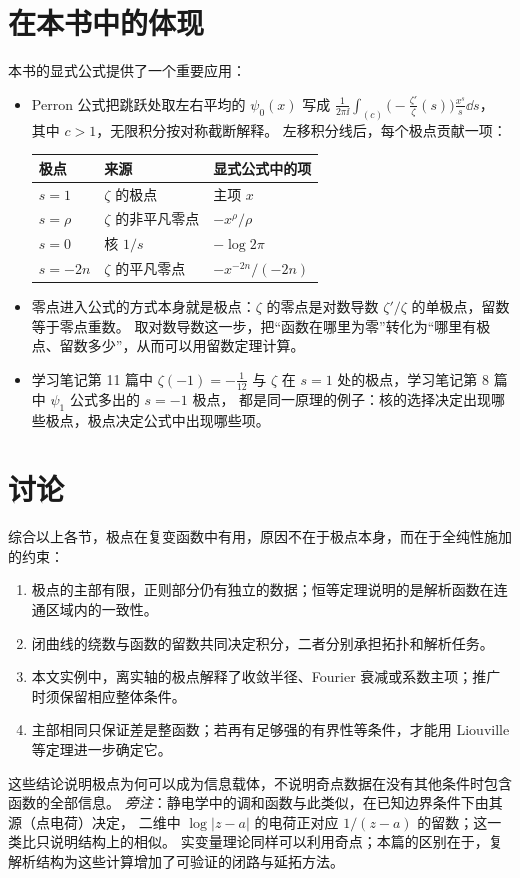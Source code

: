 \documentclass[11pt]{article}
\begin{document}
\section{在本书中的体现}
本书的显式公式提供了一个重要应用：
\begin{itemize}
 \item Perron 公式把跳跃处取左右平均的 $\psi_0(x)$ 写成 $\frac1{2\pi\ii}\int_{(c)}\bigl(-\frac{\zeta'}{\zeta}(s)\bigr)\frac{x^s}s\dd s$，
 其中 $c>1$，无限积分按对称截断解释。
 左移积分线后，每个极点贡献一项：
 \begin{center}
 \small
 \begin{tabular}{lll}
 \toprule
 极点 & 来源 & 显式公式中的项\\
 \midrule
 $s=1$ & $\zeta$ 的极点 & 主项 $x$\\
 $s=\rho$ & $\zeta$ 的非平凡零点 & $-x^\rho/\rho$\\
 $s=0$ & 核 $1/s$ & $-\log2\pi$\\
 $s=-2n$ & $\zeta$ 的平凡零点 & $-x^{-2n}/(-2n)$\\
 \bottomrule
 \end{tabular}
 \end{center}
 \item 零点进入公式的方式本身就是极点：$\zeta$ 的零点是对数导数 $\zeta'/\zeta$ 的单极点，留数等于零点重数。
 取对数导数这一步，把“函数在哪里为零”转化为“哪里有极点、留数多少”，从而可以用留数定理计算。
 \item 学习笔记第 11 篇中 $\zeta(-1)=-\tfrac1{12}$ 与 $\zeta$ 在 $s=1$ 处的极点，学习笔记第 8 篇中 $\psi_1$ 公式多出的 $s=-1$ 极点，
 都是同一原理的例子：核的选择决定出现哪些极点，极点决定公式中出现哪些项。
\end{itemize}

\section{讨论}
综合以上各节，极点在复变函数中有用，原因不在于极点本身，而在于全纯性施加的约束：
\begin{enumerate}
 \item 极点的主部有限，正则部分仍有独立的数据；恒等定理说明的是解析函数在连通区域内的一致性。
 \item 闭曲线的绕数与函数的留数共同决定积分，二者分别承担拓扑和解析任务。
 \item 本文实例中，离实轴的极点解释了收敛半径、Fourier 衰减或系数主项；推广时须保留相应整体条件。
 \item 主部相同只保证差是整函数；若再有足够强的有界性等条件，才能用 Liouville 等定理进一步确定它。
\end{enumerate}
这些结论说明极点为何可以成为信息载体，不说明奇点数据在没有其他条件时包含函数的全部信息。
\emph{旁注}：静电学中的调和函数与此类似，在已知边界条件下由其源（点电荷）决定，
二维中 $\log|z-a|$ 的电荷正对应 $1/(z-a)$ 的留数；这一类比只说明结构上的相似。
实变量理论同样可以利用奇点；本篇的区别在于，复解析结构为这些计算增加了可验证的闭路与延拓方法。
\end{document}
